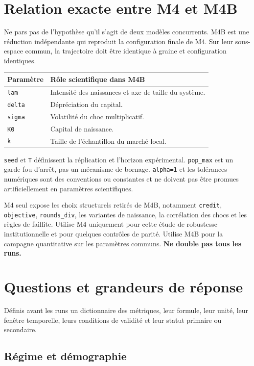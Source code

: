 \documentclass[11pt,a4paper]{article}
\newcommand{\code}[1]{\texttt{\color{navy}#1}}
\newcommand{\term}[1]{\textbf{\color{navy}#1}}
\begin{document}
\section{Relation exacte entre M4 et M4B}

Ne pars pas de l'hypothèse qu'il s'agit de deux modèles concurrents. M4B est
une réduction indépendante qui reproduit la configuration finale de M4. Sur
leur sous-espace commun, la trajectoire doit être identique à graine et
configuration identiques.

\begin{longtable}{@{}p{}p{}@{}}
\toprule
\textbf{Paramètre} & \textbf{Rôle scientifique dans M4B} \\
\midrule
\endhead
\code{lam} & Intensité des naissances et axe de taille du système. \\
\code{delta} & Dépréciation du capital. \\
\code{sigma} & Volatilité du choc multiplicatif. \\
\code{K0} & Capital de naissance. \\
\code{k} & Taille de l'échantillon du marché local. \\
\bottomrule
\end{longtable}

\code{seed} et \code{T} définissent la réplication et l'horizon expérimental.
\code{pop\_max} est un garde-fou d'arrêt, pas un mécanisme de bornage.
\code{alpha=1} et les tolérances numériques sont des conventions ou constantes
et ne doivent pas être promues artificiellement en paramètres scientifiques.

M4 seul expose les choix structurels retirés de M4B, notamment \code{credit},
\code{objective}, \code{rounds\_div}, les variantes de naissance, la
corrélation des chocs et les règles de faillite. Utilise M4 uniquement pour
cette étude de robustesse institutionnelle et pour quelques contrôles de
parité. Utilise M4B pour la campagne quantitative sur les paramètres communs.
\term{Ne double pas tous les runs.}

\section{Questions et grandeurs de réponse}

Définis avant les runs un dictionnaire des métriques, leur formule, leur unité,
leur fenêtre temporelle, leurs conditions de validité et leur statut primaire
ou secondaire.

\subsection{Régime et démographie}
\end{document}
